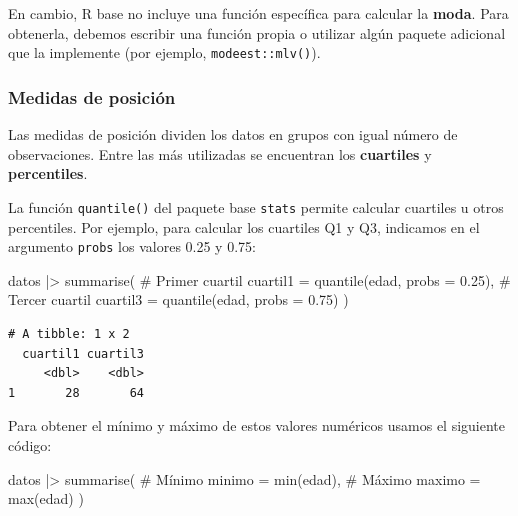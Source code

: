 \documentclass[
  spanish,
  a4paper,
]{scrbook}
\newenvironment{Shaded}{\begin{snugshade}}{\end{snugshade}}
\newcommand{\AttributeTok}[1]{\textcolor[rgb]{0.40,0.45,0.13}{#1}}
\newcommand{\CommentTok}[1]{\textcolor[rgb]{0.37,0.37,0.37}{#1}}
\newcommand{\FloatTok}[1]{\textcolor[rgb]{0.68,0.00,0.00}{#1}}
\newcommand{\FunctionTok}[1]{\textcolor[rgb]{0.28,0.35,0.67}{#1}}
\newcommand{\NormalTok}[1]{\textcolor[rgb]{0.00,0.23,0.31}{#1}}
\newcommand{\SpecialCharTok}[1]{\textcolor[rgb]{0.37,0.37,0.37}{#1}}
\begin{document}
En cambio, R base no incluye una función específica para calcular la
\textbf{moda}. Para obtenerla, debemos escribir una función propia o
utilizar algún paquete adicional que la implemente (por ejemplo,
\texttt{modeest::mlv()}).

\subsubsection{Medidas de posición}\label{medidas-de-posiciuxf3n}

Las medidas de posición dividen los datos en grupos con igual número de
observaciones. Entre las más utilizadas se encuentran los
\textbf{cuartiles} y \textbf{percentiles}.

La función \texttt{quantile()} del paquete base \texttt{stats} permite
calcular cuartiles u otros percentiles. Por ejemplo, para calcular los
cuartiles Q1 y Q3, indicamos en el argumento \texttt{probs} los valores
0.25 y 0.75:

\begin{Shaded}
\begin{Highlighting}[]
\NormalTok{datos }\SpecialCharTok{|\textgreater{}}
  \FunctionTok{summarise}\NormalTok{(}
    \CommentTok{\# Primer cuartil}
    \AttributeTok{cuartil1 =} \FunctionTok{quantile}\NormalTok{(edad, }\AttributeTok{probs =} \FloatTok{0.25}\NormalTok{),}
    \CommentTok{\# Tercer cuartil}
    \AttributeTok{cuartil3 =} \FunctionTok{quantile}\NormalTok{(edad, }\AttributeTok{probs =} \FloatTok{0.75}\NormalTok{)}
\NormalTok{  )}
\end{Highlighting}
\end{Shaded}

\begin{verbatim}
# A tibble: 1 x 2
  cuartil1 cuartil3
     <dbl>    <dbl>
1       28       64
\end{verbatim}

Para obtener el mínimo y máximo de estos valores numéricos usamos el
siguiente código:

\begin{Shaded}
\begin{Highlighting}[]
\NormalTok{datos }\SpecialCharTok{|\textgreater{}}
  \FunctionTok{summarise}\NormalTok{(}
    \CommentTok{\# Mínimo}
    \AttributeTok{minimo =} \FunctionTok{min}\NormalTok{(edad),}
    \CommentTok{\# Máximo}
    \AttributeTok{maximo =} \FunctionTok{max}\NormalTok{(edad)}
\NormalTok{  )}
\end{Highlighting}
\end{Shaded}
\end{document}
